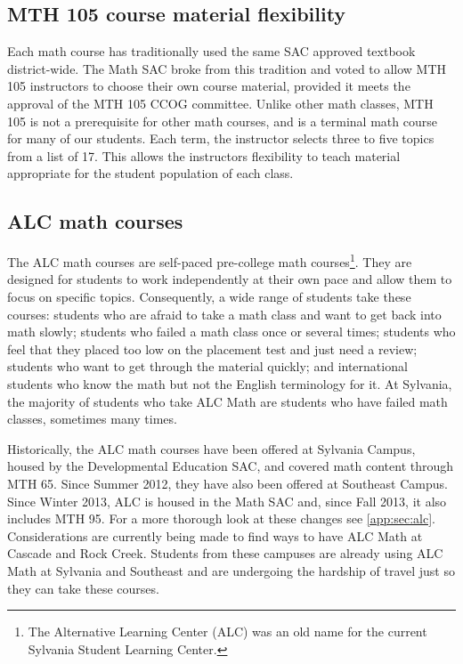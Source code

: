 \subsection{MTH 105 course material flexibility}
Each math course has traditionally used the same SAC approved textbook
district-wide.  The Math SAC broke from this tradition and voted to allow MTH
105 instructors to choose their own course material, provided it meets the
approval of the MTH 105 CCOG committee.  Unlike other math classes, MTH 105 is not a
prerequisite for other math courses, and is a terminal math course for many
of our students.  Each term, the instructor selects three to five topics from a
list of 17.  This allows the instructors flexibility to teach material
appropriate for the student population of each class.

\subsection{ALC math courses}
The ALC math courses are self-paced pre-college math courses\footnote{The Alternative
Learning Center (ALC) was an old name for the current Sylvania Student Learning Center.}.
They are designed for students to work independently at their own pace and allow
them to focus on specific topics.  Consequently, a wide range of students take
these courses: students who are afraid to take a math class and want to get back
into math slowly; students who failed a math class once or several times; students
who feel that they placed too low on the placement test and just need a review;
students who want to get through the material quickly; and international
students who know the math but not the English terminology for it.  At Sylvania,
the majority of students who take ALC Math are students who have failed math classes,
sometimes many times.

Historically, the ALC math courses have been offered at Sylvania Campus, housed
by the Developmental Education SAC, and covered math content through MTH 65.
Since Summer 2012, they have also been offered at Southeast Campus.  Since
Winter 2013, ALC is housed in the Math SAC and, since Fall 2013, it also
includes MTH 95. For a more thorough look at these changes see
\vref{app:sec:alc}. Considerations are currently being made to find ways to have
ALC Math at Cascade and Rock Creek.  Students from these campuses are
already using ALC Math at Sylvania and Southeast and are undergoing the hardship
of travel just so they can take these courses.

